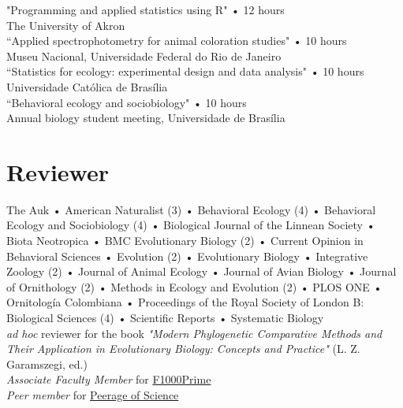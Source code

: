 \documentclass[10pt]{article}
\newcommand{\years}[1]{\marginnote{\raggedleft\scriptsize #1}}
\begin{document}
\years{2013} "Programming and applied statistics using R" • 12 hours\\ The University of Akron\\

\years{2010} “Applied spectrophotometry for animal coloration studies" • 10 hours\\ Museu Nacional, Universidade Federal do Rio de Janeiro\\

\years{2008} “Statistics for ecology: experimental design and data analysis" • 10 hours\\ Universidade Católica de Brasília\\

\years{2006} “Behavioral ecology and sociobiology" • 10 hours\\ Annual biology student meeting, Universidade de Brasília



\section*{Reviewer}
The Auk • American Naturalist (3) • Behavioral Ecology (4) • Behavioral Ecology and Sociobiology (4) • Biological Journal of the Linnean Society • Biota Neotropica • \textsc{BMC} Evolutionary Biology (2) • Current Opinion in Behavioral Sciences • Evolution (2) • Evolutionary Biology • Integrative Zoology (2) • Journal of Animal Ecology • Journal of Avian Biology • Journal of Ornithology (2) • Methods in Ecology and Evolution (2) • \textsc{PLOS ONE} • Ornitolog\'{i}a Colombiana • Proceedings of the Royal Society of London B: Biological Sciences (4) • Scientific Reports • Systematic Biology\\

\textit{ad hoc} reviewer for the book \textit{"Modern Phylogenetic Comparative Methods and Their Application in Evolutionary Biology: Concepts and Practice"} (L. Z. Garamszegi, ed.)\\

\textit{Associate Faculty Member} for \href{http://f1000.com/prime/thefaculty/member/499999771097524591}{F1000Prime}\\

\textit{Peer member} for \href{http://www.peerageofscience.org/}{Peerage of Science}
\end{document}
